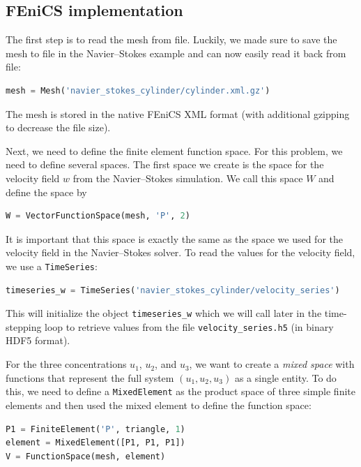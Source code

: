 \documentclass[graybox,envcountchap,sectrefs,final]{svmonodo}
\begin{document}
\subsection{FEniCS implementation}

The first step is to read the mesh from file. Luckily, we made sure to
save the mesh to file in the Navier--Stokes example and can now easily
read it back from file:

\begin{lstlisting}[language=Python,style=graycolor]
mesh = Mesh('navier_stokes_cylinder/cylinder.xml.gz')
\end{lstlisting}
The mesh is stored in the native FEniCS XML format (with additional
gzipping to decrease the file size).

Next, we need to define the finite element function space. For this
problem, we need to define several spaces. The first space we create
is the space for the velocity field $w$ from the Navier--Stokes
simulation. We call this space $W$ and define the space by

\begin{lstlisting}[language=Python,style=graycolor]
W = VectorFunctionSpace(mesh, 'P', 2)
\end{lstlisting}
It is important that this space is exactly the same as the space we
used for the velocity field in the Navier--Stokes solver. To read the
values for the velocity field, we use a \texttt{TimeSeries}:


\begin{lstlisting}[language=Python,style=graycolor]
timeseries_w = TimeSeries('navier_stokes_cylinder/velocity_series')
\end{lstlisting}
This will initialize the object \Verb!timeseries_w! which we will call
later in the time-stepping loop to retrieve values from the
file \Verb!velocity_series.h5! (in binary HDF5 format).


For the three concentrations $u_1$, $u_2$, and $u_3$, we want to
create a \emph{mixed space} with functions that represent the full system
$(u_1, u_2, u_3)$ as a single entity. To do this, we need to define a
\texttt{MixedElement} as the product space of three simple finite elements
and then used the mixed element to define the function space:

\begin{lstlisting}[language=Python,style=graycolor]
P1 = FiniteElement('P', triangle, 1)
element = MixedElement([P1, P1, P1])
V = FunctionSpace(mesh, element)
\end{lstlisting}
\end{document}
